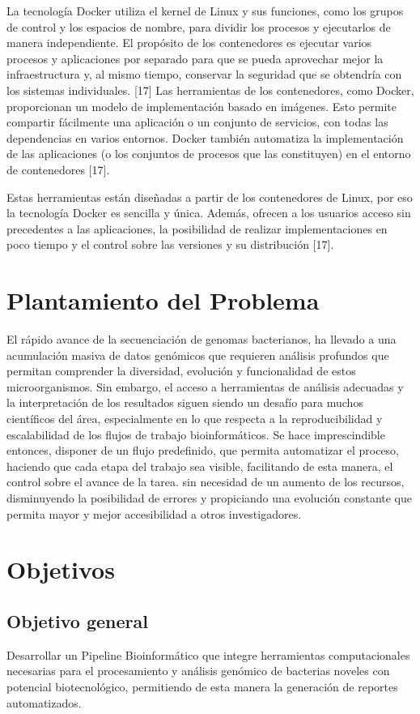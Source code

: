 \documentclass[12pt]{article}
\begin{document}
La tecnología Docker utiliza el kernel de Linux y sus funciones, como los grupos 
de control y los espacios de nombre, para dividir los procesos y ejecutarlos de 
manera independiente. El propósito de los contenedores es ejecutar varios procesos 
y aplicaciones por separado para que se pueda aprovechar mejor la infraestructura y, 
al mismo tiempo, conservar la seguridad que se obtendría con los 
sistemas individuales. [17] Las herramientas de los contenedores, 
como Docker, proporcionan un modelo de implementación basado en imágenes. 
Esto permite compartir fácilmente una aplicación o un conjunto de servicios, 
con todas las dependencias en varios entornos. Docker también automatiza la 
implementación de las aplicaciones (o los conjuntos de procesos que las constituyen) 
en el entorno de contenedores [17].

Estas herramientas están diseñadas a partir de los contenedores de Linux, por 
eso la tecnología Docker es sencilla y única. Además, ofrecen a los usuarios 
acceso sin precedentes a las aplicaciones, la posibilidad de realizar 
implementaciones en poco tiempo y el control sobre las versiones y 
su distribución [17].

\newpage
\section{Plantamiento del Problema}
El rápido avance  de la secuenciación de genomas bacterianos, ha llevado a una acumulación masiva de datos genómicos que requieren análisis profundos que permitan comprender la diversidad, evolución y funcionalidad de estos microorganismos. Sin embargo, el acceso a herramientas de análisis adecuadas y la interpretación de los resultados siguen siendo un desafío para muchos científicos del área, especialmente en lo que respecta a la reproducibilidad y escalabilidad de los flujos de trabajo bioinformáticos. Se hace imprescindible entonces, disponer de un flujo predefinido, que permita automatizar el proceso, haciendo que cada etapa del trabajo sea visible, facilitando de esta manera, el control sobre el avance de la tarea. sin necesidad de un aumento de los recursos,  disminuyendo la posibilidad de errores y  propiciando una evolución constante que permita mayor y mejor accesibilidad a otros investigadores.

\newpage
\section{Objetivos}
\subsection{Objetivo general}
Desarrollar un Pipeline Bioinformático que integre herramientas  computacionales necesarias para el procesamiento y  análisis genómico de bacterias noveles con potencial biotecnológico, permitiendo de esta manera la generación de reportes automatizados.
\end{document}
